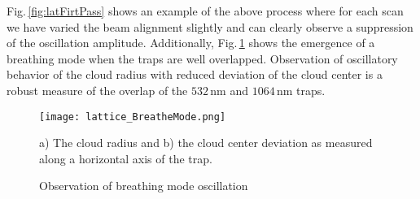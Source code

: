 Fig.\,\ref{fig:latFirtPass} shows an example of the above process where for each scan we have varied the beam alignment slightly and can clearly observe a suppression of the oscillation amplitude.	
Additionally, Fig.\,\ref{fig:latBreatheMode} shows the emergence of a breathing mode when the traps are well overlapped.
Observation of oscillatory behavior of the cloud radius with reduced deviation of the cloud center is a robust measure of the overlap of the $532$\,nm and $1064$\,nm traps.
	\begin{figure} 
		\centerline{
		\texttt{[image: lattice\_BreatheMode.png]}}
		\caption{Observation of breathing mode oscillation}{a) The cloud radius and b) the cloud center deviation as measured along a horizontal axis of the trap.}
		\label{fig:latBreatheMode}
	\end{figure}
	


